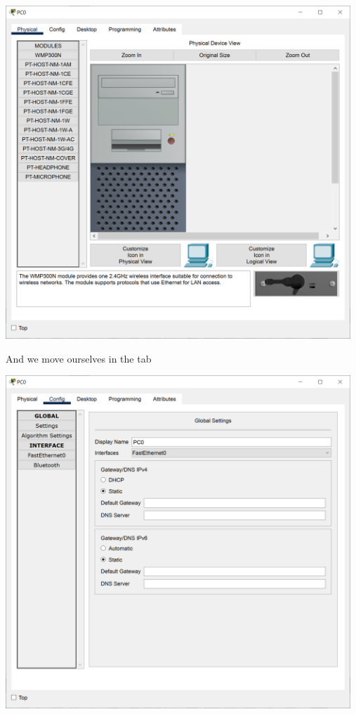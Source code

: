 \documentclass[a4paper,12pt]{article}
\begin{document}
\noindent \includegraphics[width=13cm]{./step-by-step/3.PNG}
\clearpage

\noindent And we move ourselves in the  tab \newline

\noindent \includegraphics[width=13cm]{./step-by-step/4.PNG}
\clearpage
\end{document}
